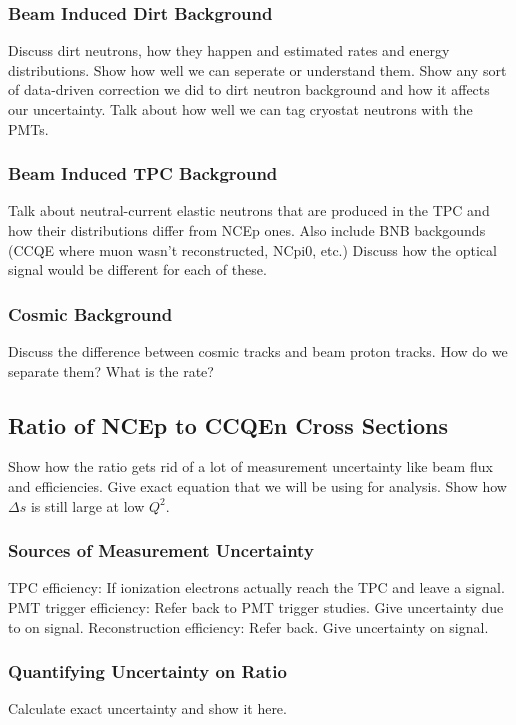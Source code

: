   \subsubsection{Beam Induced Dirt Background}
    Discuss dirt neutrons, how they happen and estimated rates and energy
    distributions.  Show how well we can seperate or understand them. Show any
    sort of data-driven correction we did to dirt neutron background and how it
    affects our uncertainty. Talk about how well we can tag cryostat neutrons
    with the PMTs.
  \subsubsection{Beam Induced TPC Background}
    Talk about neutral-current elastic neutrons that are produced in the TPC
    and how their distributions differ from NCEp ones. Also include BNB
    backgounds (CCQE where muon wasn't reconstructed, NCpi0, etc.) Discuss how
    the optical signal would be different for each of these.
  \subsubsection{Cosmic Background}
    Discuss the difference between cosmic tracks and beam proton tracks. How do
    we separate them? What is the rate?

\subsection{Ratio of NCEp to CCQEn Cross Sections}\label{sec:ratios}
  Show how the ratio gets rid of a lot of measurement uncertainty like beam
  flux and efficiencies. Give exact equation that we will be using for
  analysis. Show how $\Delta s$ is still large at low $Q^2$.
  \subsubsection{Sources of Measurement Uncertainty}
    TPC efficiency: If ionization electrons actually reach the
    TPC and leave a signal.
    PMT trigger efficiency: Refer back to PMT trigger studies. Give uncertainty
    due to on signal.
    Reconstruction efficiency: Refer back. Give uncertainty on signal.
  \subsubsection{Quantifying Uncertainty on Ratio}\label{errorcalc}
    Calculate exact uncertainty and show it here.
